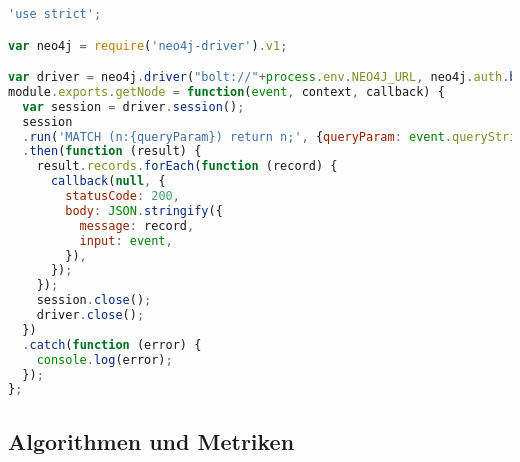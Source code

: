 \begin{lstlisting}[language=JavaScript]
	'use strict';

var neo4j = require('neo4j-driver').v1;

var driver = neo4j.driver("bolt://"+process.env.NEO4J_URL, neo4j.auth.basic("neo4j" ,"linuxisgreat"));
module.exports.getNode = function(event, context, callback) {
  var session = driver.session();
  session
  .run('MATCH (n:{queryParam}) return n;', {queryParam: event.queryStringParameters.label})
  .then(function (result) {
    result.records.forEach(function (record) {
      callback(null, {
        statusCode: 200,
        body: JSON.stringify({
          message: record,
          input: event,
        }),
      });
    });
    session.close();
    driver.close();
  })
  .catch(function (error) {
    console.log(error);
  });
};


\end{lstlisting}

\subsection{Algorithmen und Metriken}
